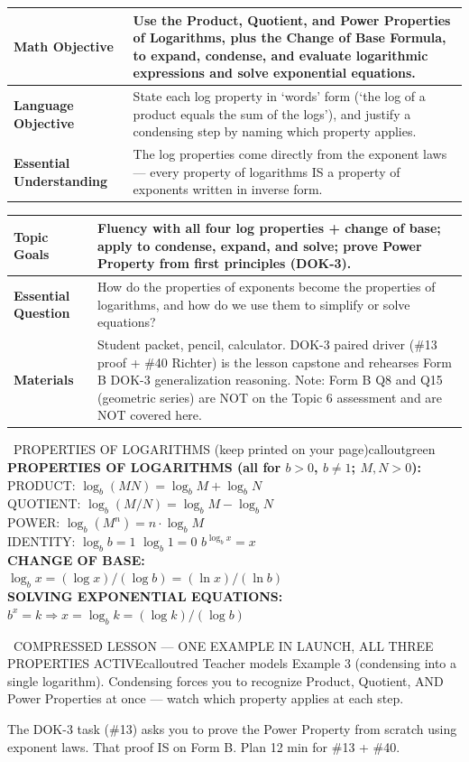 \documentclass[11pt]{article}
\newcommand{\lessonrow}[2]{\textbf{#1} & #2 \\ \hline}
\newcommand{\logrulescard}{%
\textbf{PROPERTIES OF LOGARITHMS (all for \(b > 0\), \(b \neq 1\); \(M, N > 0\)):}\\
\hspace*{1.4em}PRODUCT: \(\log_b(MN) = \log_b M + \log_b N\)\\
\hspace*{1.4em}QUOTIENT: \(\log_b(M/N) = \log_b M - \log_b N\)\\
\hspace*{1.4em}POWER: \(\log_b(M^n) = n \cdot \log_b M\)\\
\hspace*{1.4em}IDENTITY: \(\log_b b = 1\) \hspace{1.2em} \(\log_b 1 = 0\) \hspace{1.2em} \(b^{\log_b x} = x\)\\
\textbf{CHANGE OF BASE:}\\
\hspace*{1.4em}\(\log_b x = (\log x) / (\log b) = (\ln x) / (\ln b)\)\\
\textbf{SOLVING EXPONENTIAL EQUATIONS:}\\
\hspace*{1.4em}\(b^x = k \Rightarrow x = \log_b k = (\log k) / (\log b)\)%
}
\begin{document}

{\small
\renewcommand{\arraystretch}{1.25}
\noindent\begin{tabular}{|p{1.8in}|p{4.8in}|}
\hline
\lessonrow{Math Objective}{Use the Product, Quotient, and Power Properties of Logarithms, plus the Change of Base Formula, to expand, condense, and evaluate logarithmic expressions and solve exponential equations.}
\lessonrow{Language Objective}{State each log property in `words' form (`the log of a product equals the sum of the logs'), and justify a condensing step by naming which property applies.}
\lessonrow{Essential Understanding}{The log properties come directly from the exponent laws --- every property of logarithms IS a property of exponents written in inverse form.}
\end{tabular}
}

{\small
\renewcommand{\arraystretch}{1.25}
\noindent\begin{tabular}{|p{1.8in}|p{4.8in}|}
\hline
\lessonrow{Topic Goals}{Fluency with all four log properties + change of base; apply to condense, expand, and solve; prove Power Property from first principles (DOK-3).}
\lessonrow{Essential Question}{How do the properties of exponents become the properties of logarithms, and how do we use them to simplify or solve equations?}
\lessonrow{Materials}{Student packet, pencil, calculator. DOK-3 paired driver (\#13 proof + \#40 Richter) is the lesson capstone and rehearses Form B DOK-3 generalization reasoning. Note: Form B Q8 and Q15 (geometric series) are NOT on the Topic 6 assessment and are NOT covered here.}
\end{tabular}
}


\begin{callout}{\IconBook\ PROPERTIES OF LOGARITHMS (keep printed on your page)}{calloutgreen}
\logrulescard
\end{callout}

\begin{callout}{\IconWarn\ COMPRESSED LESSON --- ONE EXAMPLE IN LAUNCH, ALL THREE PROPERTIES ACTIVE}{calloutred}
Teacher models Example 3 (condensing into a single logarithm). Condensing forces you to recognize Product, Quotient, AND Power Properties at once --- watch which property applies at each step.

The DOK-3 task (\#13) asks you to prove the Power Property from scratch using exponent laws. That proof IS on Form B. Plan 12 min for \#13 + \#40.
\end{callout}
\end{document}

